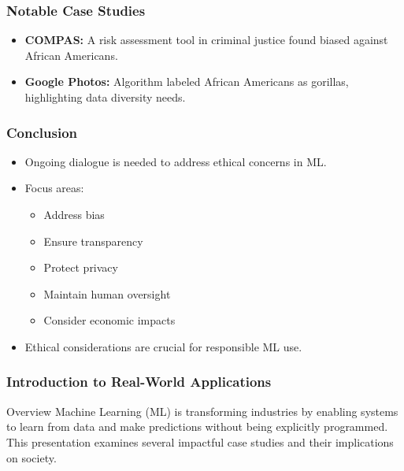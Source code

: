 \documentclass[aspectratio=169]{beamer}
\begin{document}
\begin{frame}[fragile]
    \frametitle{Notable Case Studies}
    \begin{itemize}
        \item \textbf{COMPAS:} A risk assessment tool in criminal justice found biased against African Americans.
        \item \textbf{Google Photos:} Algorithm labeled African Americans as gorillas, highlighting data diversity needs.
    \end{itemize}
\end{frame}

\begin{frame}[fragile]
    \frametitle{Conclusion}
    \begin{itemize}
        \item Ongoing dialogue is needed to address ethical concerns in ML.
        \item Focus areas:
        \begin{itemize}
            \item Address bias
            \item Ensure transparency
            \item Protect privacy
            \item Maintain human oversight
            \item Consider economic impacts
        \end{itemize}
        \item Ethical considerations are crucial for responsible ML use.
    \end{itemize}
\end{frame}

\begin{frame}[fragile]
    \frametitle{Introduction to Real-World Applications}
    \begin{block}{Overview}
        Machine Learning (ML) is transforming industries by enabling systems to learn from data and make predictions without being explicitly programmed. 
        This presentation examines several impactful case studies and their implications on society.
    \end{block}
\end{frame}
\end{document}
